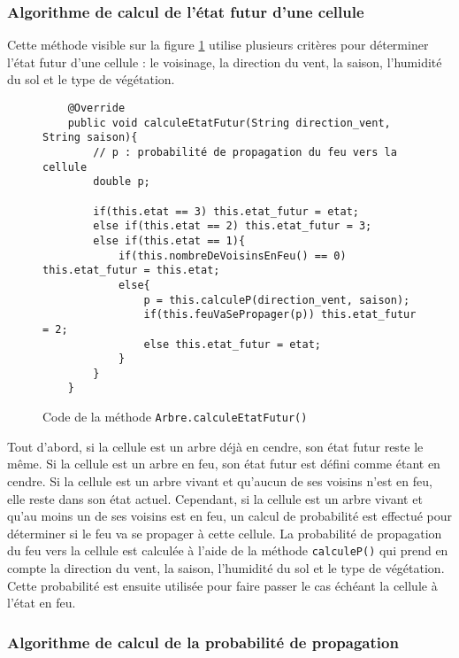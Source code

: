\subsubsection{Algorithme de calcul de l’état futur d’une cellule}
\label{sec:calculEtatFutur}

Cette méthode visible sur la figure \ref{fig:calculEtatFutur} utilise plusieurs critères pour déterminer l'état futur d'une cellule : le voisinage, la direction du vent, la saison, l'humidité du sol et le type de végétation.

\begin{figure}[htbp]
    \centering
    \begin{lstlisting}
    @Override
    public void calculeEtatFutur(String direction_vent, String saison){
        // p : probabilité de propagation du feu vers la cellule
        double p;

        if(this.etat == 3) this.etat_futur = etat;
        else if(this.etat == 2) this.etat_futur = 3;
        else if(this.etat == 1){
            if(this.nombreDeVoisinsEnFeu() == 0) this.etat_futur = this.etat;
            else{
                p = this.calculeP(direction_vent, saison);
                if(this.feuVaSePropager(p)) this.etat_futur = 2;
                else this.etat_futur = etat;
            }
        }
    }
    \end{lstlisting}
    \caption{Code de la méthode \texttt{Arbre.calculeEtatFutur()}}
    \label{fig:calculEtatFutur}
\end{figure}

Tout d'abord, si la cellule est un arbre déjà en cendre, son état futur reste le même. Si la cellule est un arbre en feu, son état futur est défini comme étant en cendre. Si la cellule est un arbre vivant et qu'aucun de ses voisins n'est en feu, elle reste dans son état actuel. Cependant, si la cellule est un arbre vivant et qu'au moins un de ses voisins est en feu, un calcul de probabilité est effectué pour déterminer si le feu va se propager à cette cellule. La probabilité de propagation du feu vers la cellule est calculée à l'aide de la méthode \texttt{calculeP()} qui prend en compte la direction du vent, la saison, l'humidité du sol et le type de végétation. Cette probabilité est ensuite utilisée pour faire passer le cas échéant la cellule à l'état en feu.

\subsubsection{Algorithme de calcul de la probabilité de propagation}

